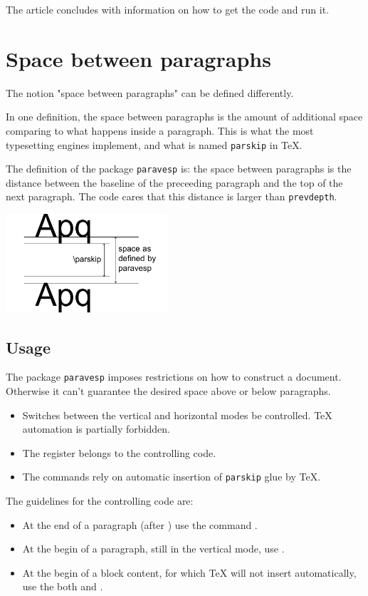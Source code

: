\documentclass[]{ltugboat}
\begin{document}
The article concludes with information on how to get the code and run it.

\section{Space between paragraphs}

The notion "space between paragraphs" can be defined differently.

In one definition, the space between paragraphs is the amount of additional space comparing to what happens inside a paragraph. This is what the most typesetting engines implement, and what is named \verb|parskip| in \TeX{}.

The definition of the package \verb|paravesp| is: the space between paragraphs is the distance between the baseline of the preceeding paragraph and the top of the next paragraph. The code cares that this distance is larger than \verb|prevdepth|.

\smallskip
\includegraphics[width=6cm]{betwpara.pdf}

\subsection{Usage}

The package \verb|paravesp| imposes restrictions on how to construct a document. Otherwise it can't guarantee the desired space above or below paragraphs.

\begin{itemize}
\item Switches between the vertical and horizontal modes be controlled. \TeX{} automation is partially forbidden.
\item The register  belongs to the controlling code.
\item The commands rely on automatic insertion of \verb|parskip| glue by \TeX.
\end{itemize}

\noindent The guidelines for the controlling code are:

\begin{itemize}
\item At the end of a paragraph (after ) use the command .
\item At the begin of a paragraph, still in the vertical mode, use .
\item At the begin of a block content, for which \TeX{} will not insert  automatically, use the both  and .
\end{itemize}
\end{document}
